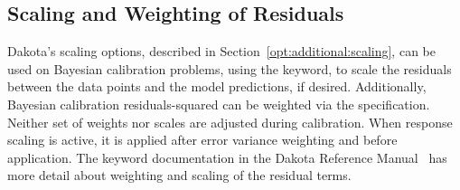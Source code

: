 \subsection{Scaling and Weighting of Residuals}

Dakota's scaling options, described in
Section~\ref{opt:additional:scaling}, can be used on Bayesian
calibration problems, using the 
keyword, to scale the residuals between the data points and the model
predictions, if desired. Additionally, Bayesian calibration
residuals-squared can be weighted via the  specification. Neither set of weights nor scales are adjusted
during calibration.  When response scaling is active, it is applied
after error variance weighting and before 
application. The  keyword documentation in
the Dakota Reference Manual~\cite{RefMan} has more detail about
weighting and scaling of the residual terms.

